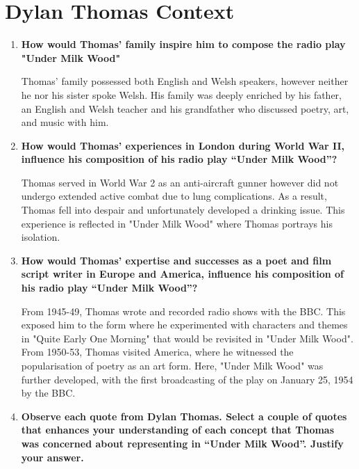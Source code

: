 \newpage

\section{Dylan Thomas Context}

	\begin{enumerate}
		\item \textbf{How would Thomas' family inspire him to compose the radio play "Under Milk Wood"}

			\subitem Thomas' family possessed both English and Welsh speakers, however neither he nor his sister spoke Welsh. His family was deeply enriched by his father, an English and Welsh teacher and his grandfather who discussed poetry, art, and music with him.

		\item \textbf{How would Thomas’ experiences in London during World War II, influence his composition of his radio play “Under Milk Wood”?}

			\subitem Thomas served in World War 2 as an anti-aircraft gunner however did not undergo extended active combat due to lung complications. As a result, Thomas fell into despair and unfortunately developed a drinking issue. This experience is reflected in "Under Milk Wood" where Thomas portrays his isolation.

		\item \textbf{How would Thomas’ expertise and successes as a poet and film script writer in Europe and America, influence his composition of his radio play “Under Milk Wood”?}

			\subitem From 1945-49, Thomas wrote and recorded radio shows with the BBC. This exposed him to the form where he experimented with characters and themes in "Quite Early One Morning" that would be revisited in "Under Milk Wood". From 1950-53, Thomas visited America, where he witnessed the popularisation of poetry as an art form. Here, "Under Milk Wood" was further developed, with the first broadcasting of the play on January 25, 1954 by the BBC.
\newpage
		\item \textbf{Observe each quote from Dylan Thomas. Select a couple of quotes that enhances your understanding of each concept that Thomas was concerned about representing in “Under Milk Wood”. Justify your answer.}


\end{enumerate}
